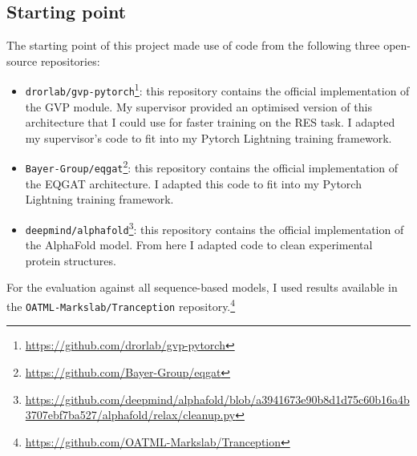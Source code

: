 \subsection{Starting point}
The starting point of this project made use of code from the following three open-source repositories:
\begin{itemize}
    \item \texttt{drorlab/gvp-pytorch}\footnote{\url{https://github.com/drorlab/gvp-pytorch}}: this repository contains the official implementation of the GVP \cite{gvp1, gvp2} module. My supervisor provided an optimised version of this architecture that I could use for faster training on the RES task. I adapted my supervisor's code to fit into my Pytorch Lightning training framework. 
    \item \texttt{Bayer-Group/eqgat}\footnote{\url{https://github.com/Bayer-Group/eqgat}}: this repository contains the official implementation of the EQGAT \cite{eqgat, eqgat2} architecture. I adapted this code to fit into my Pytorch Lightning training framework. 
    \item \texttt{deepmind/alphafold}\footnote{\url{https://github.com/deepmind/alphafold/blob/a3941673e90b8d1d75c60b16a4b3707ebf7ba527/alphafold/relax/cleanup.py}}: this repository contains the official implementation of the AlphaFold \cite{alphafold} model. From here I adapted code to clean experimental protein structures. 
\end{itemize}
For the evaluation against all sequence-based models, I used results available in the \texttt{OATML-Markslab/Tranception} repository.\footnote{\url{https://github.com/OATML-Markslab/Tranception}}